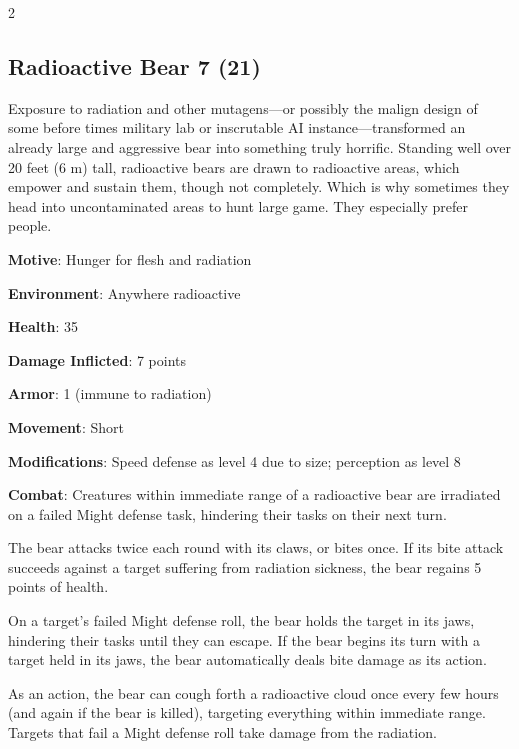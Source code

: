 \begin{multicols}{2}

\subsection{Radioactive Bear 7 (21)}

Exposure to radiation and other mutagens—or possibly the malign design of some before times military lab or inscrutable AI instance—transformed an already large and aggressive bear into something truly horrific. Standing well over 20 feet (6 m) tall, radioactive bears are drawn to radioactive areas, which empower and sustain them, though not completely. Which is why sometimes they head into uncontaminated areas to hunt large game. They especially prefer people.

\textbf{Motive}: Hunger for flesh and radiation 

\textbf{Environment}: Anywhere radioactive 

\textbf{Health}: 35 

\textbf{Damage Inflicted}: 7 points 

\textbf{Armor}: 1 (immune to radiation) 

\textbf{Movement}: Short 

\textbf{Modifications}: Speed defense as level 4 due to size; perception as level 8 

\textbf{Combat}: Creatures within immediate range of a radioactive bear are irradiated on a failed Might defense task, hindering their tasks on their next turn. 

The bear attacks twice each round with its claws, or bites once. If its bite attack succeeds against a target suffering from radiation sickness, the bear regains 5 points of health. 

On a target’s failed Might defense roll, the bear holds the target in its jaws, hindering their tasks until they can escape. If the bear begins its turn with a target held in its jaws, the bear automatically deals bite damage as its action. 

As an action, the bear can cough forth a radioactive cloud once every few hours (and again if the bear is killed), targeting everything within immediate range. Targets that fail a Might defense roll take damage from the radiation. 


\end{multicols}
